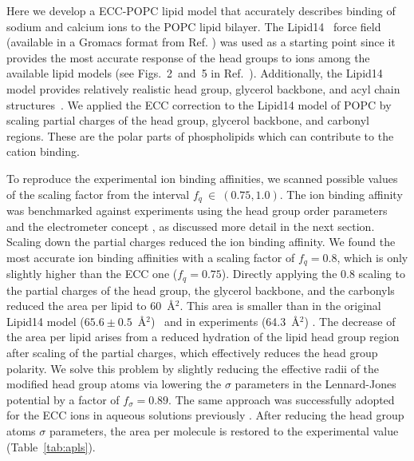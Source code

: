 \documentclass[journal=jpcbfk,manuscript=article]{achemso}
\begin{document}
Here we develop a ECC-POPC lipid model that accurately describes binding 
of sodium and calcium ions to the POPC  lipid bilayer. 
The Lipid14~\cite{dickson14} force field 
(available in a Gromacs format from Ref. ) was used as a starting 
point since 
it provides the most accurate response of the head groups to ions among the available 
lipid models (see Figs.~2~and~5 in Ref.~). Additionally, the Lipid14 model 
provides relatively realistic head group, glycerol backbone, and acyl chain structures~\cite{dickson14,botan15}.
We applied the ECC correction 
to the Lipid14 model of POPC by scaling 
partial charges of the head group, glycerol 
backbone, and carbonyl regions. 
These are the polar parts of phospholipids which can 
contribute to the cation binding. 

To reproduce the experimental ion binding affinities,
we scanned possible values of the scaling factor from the interval $f_q~\in~(0.75, 1.0)$.
The ion binding affinity was benchmarked against experiments
using the head group order parameters and the electrometer concept \cite{seelig87,catte16},
as discussed more detail in the next section.
Scaling down the partial charges reduced the ion binding affinity.
We found the most accurate ion binding affinities with a scaling factor of $f_q = 0.8$,
which is only slightly higher than the ECC one ($f_q=0.75$).
Directly applying
the 0.8 scaling to the partial charges of the head group, the glycerol backbone, and
the carbonyls reduced the area per lipid to 60~\AA$^2$. This area is smaller than in the
original Lipid14 model ($65.6 \pm 0.5$~\AA$^2$)~\cite{dickson14} and in experiments
(64.3~\AA$^2$) \cite{kucerka11}. The decrease of the area per lipid arises from a
reduced hydration of the lipid head group region after scaling of the partial charges, which effectively
reduces the head group polarity. We solve this problem by slightly reducing the effective radii of
the modified head group atoms via lowering the $\sigma$ parameters in the Lennard-Jones potential by a
factor of $f_\sigma = 0.89$. The same approach was successfully adopted for the ECC ions in aqueous
solutions previously \cite{kohagen14, kohagen16, Pluharova2014, martinek17}. After reducing the head group atoms $\sigma$ parameters, the area per molecule is restored to the experimental value (Table~\ref{tab:apls}). 
\end{document}

